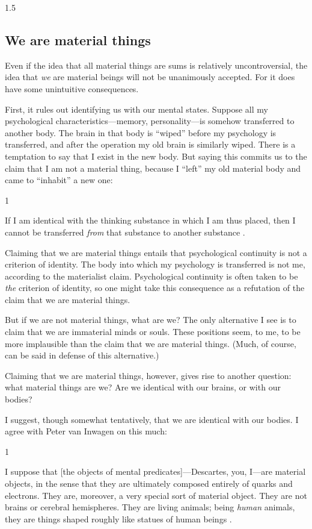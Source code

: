 \documentclass[11pt]{article}
\newenvironment{squote}{%
\begin{spacing}{1}
\begin{list}{}{%
\setlength{\labelwidth}{0pt}%
\rightmargin\leftmargin%
}
\item\relax
}{%
\end{list}%
\end{spacing}
}
\begin{document}
\begin{spacing}{1.5}
\subsection{We are material things}
\label{material-beings}
Even if the idea that all material things are sums is relatively
uncontroversial, the idea that {\em we} are material beings will not
be unanimously accepted.  For it does have some unintuitive
consequences.

First, it rules out identifying us with our mental states.  Suppose
all my psychological characteristics---memory, personality---is
somehow transferred to another body.  The brain in that body is
``wiped'' before my psychology is transferred, and after the operation
my old brain is similarly wiped.  There is a temptation to say that I
exist in the new body.  But saying this commits us to the claim that I
am not a material thing, because I ``left'' my old material body and
came to ``inhabit'' a new one:

\begin{squote}
 If I am identical with the thinking substance in which I am thus
 placed, then I cannot be transferred {\em from} that substance to
 another substance \citep[107]{chisholm1979}.
\end{squote}

Claiming that we are material things entails that psychological
continuity is not a criterion of identity.  The body into which my
psychology is transferred is not me, according to the materialist
claim.  Psychological continuity is often taken to be {\em the}
criterion of identity, so one might take this consequence as a
refutation of the claim that we are material things.

But if we are not material things, what are we?  The only alternative
I see is to claim that we are immaterial minds or souls.  These
positions seem, to me, to be more implausible than the claim that we
are material things.  (Much, of course, can be said in defense of this
alternative.)

Claiming that we are material things, however, gives rise to another
question: what material things are we?  Are we identical with our
brains, or with our bodies?

I suggest, though somewhat tentatively, that we are identical with our
bodies.  I agree with Peter van Inwagen on this much:

\begin{squote}
I suppose that [the objects of mental predicates]---Descartes, you,
I---are material objects, in the sense that they are ultimately
composed entirely of quarks and electrons.  They are, moreover, a very
special sort of material object.  They are not brains or cerebral
hemispheres.  They are living animals; being {\em human} animals, they
are things shaped roughly like statues of human beings
\citeyearpar[6]{inwagen1995}.
\end{squote}


\end{spacing}
\end{document}
